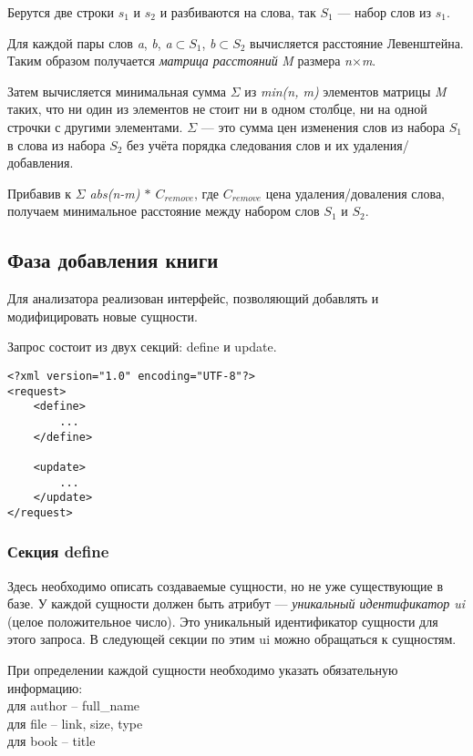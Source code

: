 {
{
Берутся две строки \textit{$s_{1}$} и \textit{$s_{2}$} и разбиваются на слова, так \textit{$S_{1}$} --- набор слов из \textit{$s_{1}$}.

Для каждой пары слов \textit{a}, \textit{b}, \textit{a}$\subset$\textit{$S_{1}$}, \textit{b}$\subset$\textit{$S_{2}$} вычисляется  расстояние Левенштейна.
Таким образом получается {\em матрица расстояний} \textit{M} размера \textit{n}$\times$\textit{m}.

Затем вычисляется минимальная сумма $\Sigma$ из \textit{min(n, m)} элементов матрицы \textit{M} таких,
что ни один из элементов не стоит ни в одном столбце, ни на одной строчки с другими элементами.
$\Sigma$ --- это сумма цен изменения слов из набора \textit{$S_{1}$} в слова из набора \textit{$S_{2}$} без учёта порядка следования слов
и их удаления/добавления.

Прибавив к $\Sigma$ \textit{abs(n-m) $\ast$ $C_{remove}$}, где \textit{$C_{remove}$} цена удаления/доваления слова, получаем минимальное расстояние между набором слов \textit{$S_{1}$} и \textit{$S_{2}$}.
}
}


\subsection{Фаза добавления книги}


Для анализатора реализован интерфейс, позволяющий добавлять и модифицировать новые сущности.

Запрос состоит из двух секций: define и update. 

\begin{verbatim}
<?xml version="1.0" encoding="UTF-8"?>
<request>
    <define>
        ...
    </define>

    <update>
        ...
    </update>
</request>
\end{verbatim}


\subsubsection{Секция define}

Здесь необходимо описать создаваемые сущности, но не уже существующие в базе. У каждой сущности должен быть атрибут --- {\em уникальный идентификатор ui} (целое положительное число). Это уникальный идентификатор сущности для этого запроса. В следующей секции по этим ui можно обращаться к сущностям. 

При определении каждой сущности необходимо указать обязательную информацию: \\
для author -- full\_name \\
для file -- link, size, type\\
для book -- title \\


